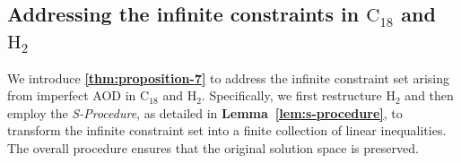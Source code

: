 \documentclass[10pt,journal,compsoc]{IEEEtran}
\theoremstyle{myremark}
\theoremstyle{myexample}
\begin{document}
 

 
\subsection{Addressing the infinite constraints in $ \mathrm{C}_{18} $ and $ \mathrm{H}_{2} $}
 

We introduce \textbf{\cref{thm:proposition-7}} to address the infinite constraint set arising from imperfect \gls{AOD} in $ \mathrm{C}_{18} $ and $ \mathrm{H}_{2} $. Specifically, we first restructure $ \mathrm{H}_{2} $ and then employ the \emph{S-Procedure}, as detailed in \textbf{Lemma~\ref{lem:s-procedure}}, to transform the infinite constraint set into a finite collection of linear inequalities. The overall procedure ensures that the original solution space is preserved. 
\end{document}
